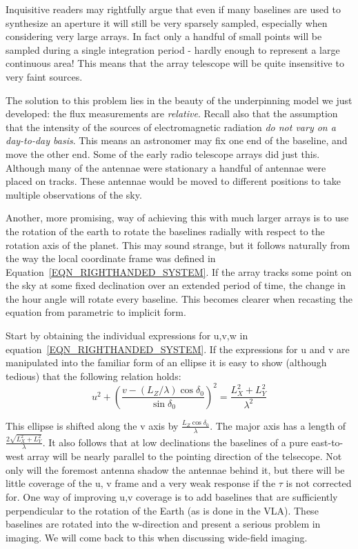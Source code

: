 \documentclass[a4paper,10pt]{report}
\begin{document}
Inquisitive readers may rightfully argue that even if many baselines are used to synthesize an aperture it will still be
very sparsely sampled, especially when considering very large arrays. In fact only a handful of small points will be 
sampled during a single integration period - hardly enough to represent a large continuous area! This means that 
the array telescope will be quite insensitive to very faint sources.

The solution to this problem lies in the beauty of the underpinning model we just developed: the flux measurements
are \textit{relative}. Recall also that the assumption that the intensity of the sources of electromagnetic radiation 
\textit{do not vary on a day-to-day basis}. This means an astronomer may fix one end of the baseline, and move the other
end. Some of the early radio telescope arrays did just this. Although many of the antennae were stationary a handful
of antennae were placed on tracks. These antennae would be moved to different positions to take multiple observations
of the sky.

Another, more promising, way of achieving this with much larger arrays is to use the rotation of the earth to rotate
the baselines radially with respect to the rotation axis of the planet. This may sound strange, but it 
follows naturally from the way the local coordinate frame was defined in Equation~\ref{EQN_RIGHTHANDED_SYSTEM}. If the
array tracks some point on the sky at some fixed declination over an extended period of time, the change in the hour
angle will rotate every baseline. This becomes clearer when recasting the equation from parametric to implicit form. 

Start by obtaining the individual expressions for u,v,w in equation~\ref{EQN_RIGHTHANDED_SYSTEM}. If the expressions
for u and v are manipulated into the familiar form of an ellipse it is easy to show (although tedious) that the following
relation holds:
\begin{equation*}
 u^2 + \left(\frac{v-(L_Z/\lambda)\cos{\delta_0}}{\sin{\delta_0}}\right)^2 = \frac{L_X^2 + L_Y^2}{\lambda^2}
\end{equation*}

This ellipse is shifted along the v axis by $\frac{L_Z\cos{\delta_0}}{\lambda}$. The major axis has a length of 
$\frac{2\sqrt{L_X^2 + L_Y^2}}{\lambda}$. It also follows that at low declinations the baselines 
of a pure east-to-west array will be nearly parallel to the pointing direction of the telsecope.
Not only will the foremost antenna shadow the antennae behind it, but there will be little coverage of the u, v
frame and a very weak response if the $\tau$ is not corrected for. One way of improving u,v coverage is to add baselines
that are sufficiently perpendicular to the rotation of the Earth (as is done in the VLA). These baselines are rotated into
the w-direction and present a serious problem in imaging. We will come back to this when discussing wide-field imaging.
\end{document}
